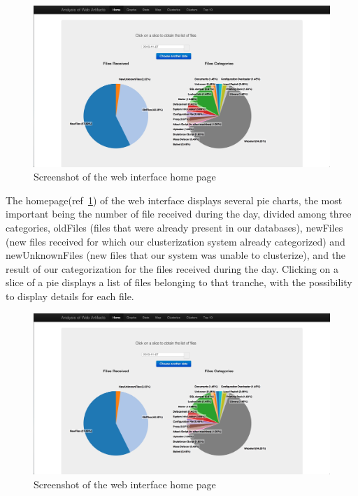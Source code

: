 \begin{figure}[tbh]
\centerline{\includegraphics[scale=0.2]{Images/honeyFace_home.jpg}}
\caption{Screenshot of the web interface home page\label{fig:web_home}}
\end{figure}

The homepage(ref~\ref{fig:web_home}) of the web interface displays several pie charts, the most important being the number of file received during the day, divided among three categories, oldFiles (files that were already present in our databases), newFiles (new files received for which our clusterization system already categorized) and newUnknownFiles (new files that our system was unable to clusterize), and the result of our categorization for the files received during the day. Clicking on a slice of a pie displays a list of files belonging to that tranche, with the possibility to display details for each file.

\begin{figure}[tbh]
\centerline{\includegraphics[scale=0.2]{Images/honeyFace_home.jpg}}
\caption{Screenshot of the web interface home page\label{fig:web_home2}}
\end{figure}

